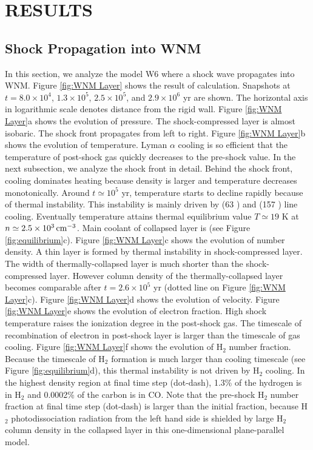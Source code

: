 \section{RESULTS}\label{section:RESULTS}

\subsection{Shock Propagation into WNM}\label{subsection:WNM}

In this section, we analyze the model W6 where a shock wave propagates
into WNM.
Figure \ref{fig:WNM Layer} shows the result of calculation.
Snapshots at 
$t=8.0\times 10^4$, $1.3\times 10^5$, $2.5\times 10^5$, and $2.9\times 10^6$ 
yr are shown.
The horizontal axis in logarithmic scale denotes distance from the rigid wall.
Figure \ref{fig:WNM Layer}a shows the evolution of pressure.
The shock-compressed layer is almost isobaric.
The shock front propagates from left to right.
Figure \ref{fig:WNM Layer}b shows the evolution of temperature.
Lyman $\alpha$ cooling is so efficient that the temperature of
post-shock gas quickly decreases to the pre-shock value.
In the next subsection, we analyze the shock front in detail.
Behind the shock front, cooling dominates heating because density is larger
and temperature decreases monotonically.
Around $t \simeq 10^5$ yr, 
temperature starts to decline rapidly because of thermal instability.
This instability is mainly driven by  (63 \micron) and  
(157 \micron) line cooling. 
Eventually temperature attains thermal equilibrium value 
$T \simeq 19$ K at $n \simeq 2.5\times 10^3 \, {\rm cm^{-3}}$. 
Main coolant of collapsed layer is  (see 
Figure \ref{fig:equilibrium}c). 
Figure \ref{fig:WNM Layer}c shows the evolution of number density.
A thin layer is formed 
by thermal instability in shock-compressed layer.
The width of thermally-collapsed layer is much shorter than the
shock-compressed layer.
However column density of the thermally-collapsed layer becomes
comparable after $t=2.6\times 10^5$ yr (dotted line on Figure
\ref{fig:WNM Layer}c).
Figure \ref{fig:WNM Layer}d shows the evolution of velocity.
Figure \ref{fig:WNM Layer}e shows the evolution of electron fraction.
High shock temperature raises the ionization degree in the post-shock gas.
The timescale of recombination of electron in post-shock layer 
is larger than the timescale of gas cooling. 
Figure \ref{fig:WNM Layer}f shows 
the evolution of H$_2$ number fraction.
Because the timescale of H$_2$ formation is much
larger than cooling timescale (see Figure \ref{fig:equilibrium}d),
this thermal instability is not driven by H$_2$ cooling.
In the highest density region at final time step (dot-dash),
1.3\% of the hydrogen is in H$_2$ and 
0.0002\% of the carbon is in CO.
Note that the 
pre-shock H$_2$ number fraction at final time step (dot-dash) is larger
than the initial fraction,
because H$_2$ photodissociation radiation from the left hand
side is shielded by large H$_2$
column density in the collapsed layer in this one-dimensional
plane-parallel model.

